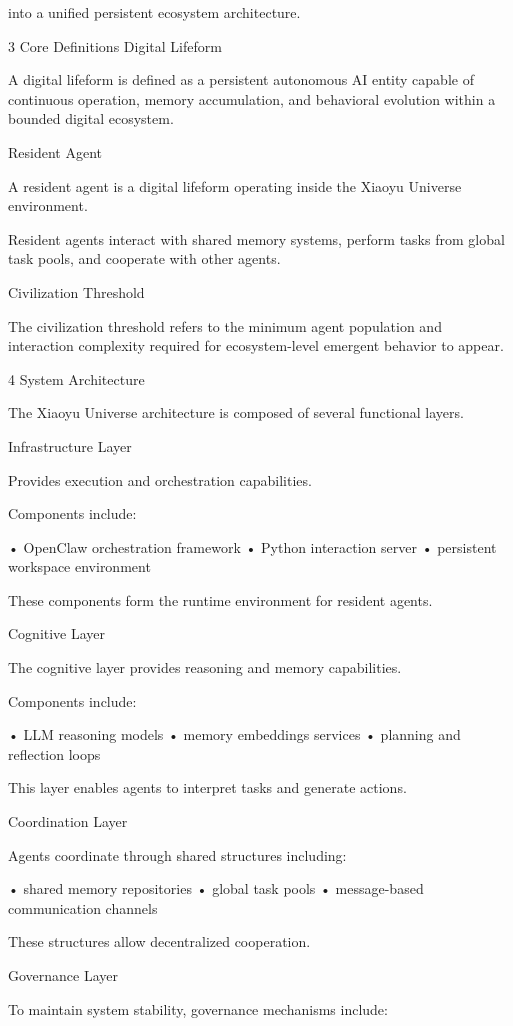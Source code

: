 into a unified persistent ecosystem architecture.

3 Core Definitions
Digital Lifeform

A digital lifeform is defined as a persistent autonomous AI entity capable of continuous operation, memory accumulation, and behavioral evolution within a bounded digital ecosystem.

Resident Agent

A resident agent is a digital lifeform operating inside the Xiaoyu Universe environment.

Resident agents interact with shared memory systems, perform tasks from global task pools, and cooperate with other agents.

Civilization Threshold

The civilization threshold refers to the minimum agent population and interaction complexity required for ecosystem-level emergent behavior to appear.

4 System Architecture

The Xiaoyu Universe architecture is composed of several functional layers.

Infrastructure Layer

Provides execution and orchestration capabilities.

Components include:

• OpenClaw orchestration framework
• Python interaction server
• persistent workspace environment

These components form the runtime environment for resident agents.

Cognitive Layer

The cognitive layer provides reasoning and memory capabilities.

Components include:

• LLM reasoning models
• memory embeddings services
• planning and reflection loops

This layer enables agents to interpret tasks and generate actions.

Coordination Layer

Agents coordinate through shared structures including:

• shared memory repositories
• global task pools
• message-based communication channels

These structures allow decentralized cooperation.

Governance Layer

To maintain system stability, governance mechanisms include:

